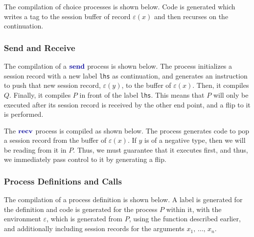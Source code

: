 The compilation of choice processes is shown below. Code is generated which writes a tag to the session buffer of record $\varepsilon(x)$ and then recurses on the continuation.

\begin{compilation}{}{\varepsilon}
\end{compilation}

\subsubsection{Send and Receive}

The compilation of a $\sendp$ process is shown below. The process initializes a session record with a new label \texttt{lhs} as continuation, and generates an instruction to push that new session record, $\varepsilon(y)$, to the buffer of $\varepsilon(x)$. Then, it compiles $Q$. Finally, it compiles $P$ in front of the label \texttt{lhs}. This means that $P$ will only be executed after its session record is received by the other end point, and a flip to it is performed.

\begin{compilation}{}{\varepsilon}
\end{compilation}

The $\recvp$ process is compiled as shown below. The process generates code to pop a session record from the buffer of $\varepsilon(x)$. If $y$ is of a negative type, then we will be reading from it in $P$. Thus, we must guarantee that it executes first, and thus, we immediately pass control to it by generating a flip.

\begin{compilation}{}{\varepsilon}
     
\end{compilation}

\subsubsection{Process Definitions and Calls}

The compilation of a process definition is shown below. A label is generated for the definition and code is generated for the process $P$ within it, with the environment $\varepsilon$, which is generated from $P$, using the function described earlier, and additionally including session records for the arguments $x_1,\,\dots,\,x_n$.

